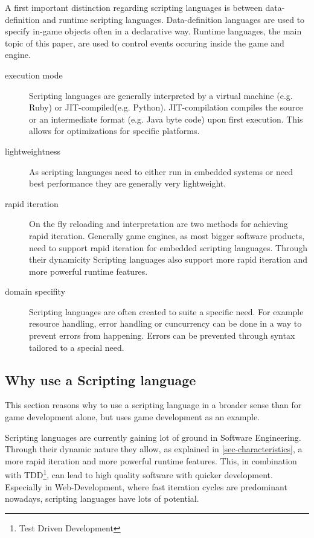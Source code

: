 \documentclass{article}
\begin{document}
A first important distinction regarding scripting languages is between
data-definition and runtime scripting languages. Data-definition languages are
used to specify in-game objects often in a declarative way. Runtime languages,
the main topic of this paper, are used to control events occuring inside the
game and engine.

\begin{description}
\item[execution mode] Scripting languages are generally interpreted by a
virtual machine (e.g. Ruby) or JIT-compiled(e.g. Python). JIT-compilation
compiles the source or an intermediate format (e.g. Java byte code) upon first
execution. This allows for optimizations for specific platforms.
\item[lightweightness] As scripting languages need to either run in embedded
systems or need best performance they are generally very lightweight.
\item[rapid iteration] On the fly reloading and interpretation are two methods
for achieving rapid iteration. Generally game engines, as most bigger software
products, need to support rapid iteration for embedded scripting languages. 
Through their dynamicity Scripting languages also support
more rapid iteration and more powerful runtime features.
\item[domain specifity] Scripting languages are often created to suite a
specific need. For example resource handling, error handling or cuncurrency can
be done in a way to prevent errors from happening. Errors can be prevented
through syntax tailored to a special need.
\end{description}

\subsection{Why use a Scripting language}
This section reasons why to use a scripting language in a broader sense than
for game development alone, but uses game development as an example.

Scripting languages are currently gaining lot of ground in Software Engineering.
Through their dynamic nature they allow, as explained in
\ref{sec-characteristics}, a more rapid iteration and more powerful runtime
features. This, in combination with TDD\footnote{Test Driven Development}, can
lead to high quality software with quicker development. Especially in
Web-Development, where fast iteration cycles are predominant nowadays,
scripting languages have lots of potential.
\end{document}
